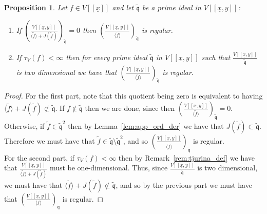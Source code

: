 \documentclass{article}
\newtheorem{proposition}[theorem]{Proposition}
\newcommand{\maxV}{\mathfrak{m}_V}
\newcommand{\Vx}{V[[\underline{x}]]}
\newcommand{\Vxy}{V[[\underline{x},y]]}
\numberwithin{theorem}{section}
\begin{document}
\begin{proposition}\label{lem:tau(f,q)}
    Let $f \in \Vx$ and let $\tilde{\mathfrak{q}}$ be a prime ideal in $\Vxy$:
    \begin{enumerate}
        \item If $\left( \frac{\Vxy}{\langle \tilde{f} \rangle + J(\tilde{f})}\right) _{\tilde{\mathfrak{q}}}=0$ then $\left(\frac{\Vxy}{\langle \tilde{f} \rangle}\right)_{\tilde{\mathfrak{q}}}$ is regular.
    
    \item If $\tau_V\left(f\right) < \infty$ then for every prime ideal $\tilde{\mathfrak{q}}$ in $\Vxy$ such that $\frac{\Vxy}{\tilde{\mathfrak{q}}}$ is two dimensional we have that  $\left(\frac{\Vxy}{\langle \tilde{f} \rangle}\right)_{\tilde{\mathfrak{q}}}$ is regular. 
    \end{enumerate}
    
\end{proposition}

\begin{proof}
    For the first part, note that this quotient being zero is equivalent to having $\langle \tilde{f} \rangle + J(\tilde{f}) \not \subset \tilde{\mathfrak{q}}$. If $f \notin \tilde{\mathfrak{q}}$ then we are done, since then $\left(\frac{\Vxy}{\langle \tilde{f} \rangle}\right)_{\tilde{\mathfrak{q}}}=0$. Otherwise, if $\tilde{f} \in \tilde{\mathfrak{q}}^2$ then by Lemma~\ref{lem:app_ord_der} we have that $J(\tilde{f}) \subset \tilde{\mathfrak{q}}$.  Therefore we must have that $\tilde{f} \in \tilde{\mathfrak{q}} \setminus \tilde{\mathfrak{q}}^2$, and so $\left(\frac{\Vxy}{\langle \tilde{f} \rangle}\right)_{\tilde{\mathfrak{q}}}$ is regular.\\

    For the second part, if $\tau_V\left(f\right) < \infty $ then by Remark~\ref{rem:tjurina_def} we have that $\frac{\Vxy}{\langle \tilde{f} \rangle + J(\tilde{f})}$ must be one-dimensional. Thus, since  $\frac{\Vxy}{\tilde{\mathfrak{q}}}$ is two dimensional, we must have that $\langle \tilde{f} \rangle + J(\tilde{f}) \not \subset \tilde{\mathfrak{q}}$, and so by the previous part we must have that
    $\left(\frac{\Vxy}{\langle f \rangle}\right)_{\tilde{\mathfrak{q}}}$ is regular.
\end{proof}
    
\end{document}
